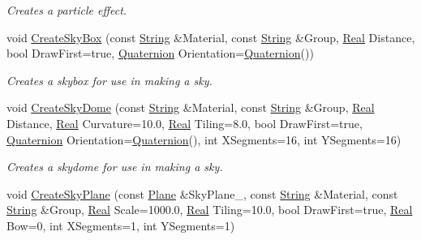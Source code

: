 \begin{DoxyCompactItemize}
\begin{DoxyCompactList}\small\item\em Creates a particle effect. \item\end{DoxyCompactList}\item 
void \hyperlink{classphys_1_1SceneManager_a24e2699227790a0431613e49f3b68db0}{CreateSkyBox} (const \hyperlink{namespacephys_aa03900411993de7fbfec4789bc1d392e}{String} \&Material, const \hyperlink{namespacephys_aa03900411993de7fbfec4789bc1d392e}{String} \&Group, \hyperlink{namespacephys_af7eb897198d265b8e868f45240230d5f}{Real} Distance, bool DrawFirst=true, \hyperlink{classphys_1_1Quaternion}{Quaternion} Orientation=\hyperlink{classphys_1_1Quaternion}{Quaternion}())
\begin{DoxyCompactList}\small\item\em Creates a skybox for use in making a sky. \item\end{DoxyCompactList}\item 
void \hyperlink{classphys_1_1SceneManager_a965bec06f491a619101c3142ca1eb47c}{CreateSkyDome} (const \hyperlink{namespacephys_aa03900411993de7fbfec4789bc1d392e}{String} \&Material, const \hyperlink{namespacephys_aa03900411993de7fbfec4789bc1d392e}{String} \&Group, \hyperlink{namespacephys_af7eb897198d265b8e868f45240230d5f}{Real} Distance, \hyperlink{namespacephys_af7eb897198d265b8e868f45240230d5f}{Real} Curvature=10.0, \hyperlink{namespacephys_af7eb897198d265b8e868f45240230d5f}{Real} Tiling=8.0, bool DrawFirst=true, \hyperlink{classphys_1_1Quaternion}{Quaternion} Orientation=\hyperlink{classphys_1_1Quaternion}{Quaternion}(), int XSegments=16, int YSegments=16)
\begin{DoxyCompactList}\small\item\em Creates a skydome for use in making a sky. \item\end{DoxyCompactList}\item 
void \hyperlink{classphys_1_1SceneManager_a5593ec052782189f77ef27a10272da8f}{CreateSkyPlane} (const \hyperlink{classphys_1_1Plane}{Plane} \&SkyPlane\_\-, const \hyperlink{namespacephys_aa03900411993de7fbfec4789bc1d392e}{String} \&Material, const \hyperlink{namespacephys_aa03900411993de7fbfec4789bc1d392e}{String} \&Group, \hyperlink{namespacephys_af7eb897198d265b8e868f45240230d5f}{Real} Scale=1000.0, \hyperlink{namespacephys_af7eb897198d265b8e868f45240230d5f}{Real} Tiling=10.0, bool DrawFirst=true, \hyperlink{namespacephys_af7eb897198d265b8e868f45240230d5f}{Real} Bow=0, int XSegments=1, int YSegments=1)

\end{DoxyCompactItemize}
